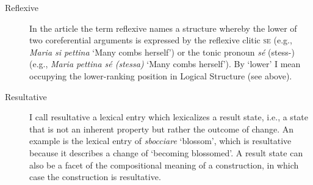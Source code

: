 \documentclass[output=paper,colorlinks,citecolor=brown
]{langscibook}
\begin{document}
\begin{description}
\item[Reflexive] In the article the term reflexive   names a structure whereby the lower of two coreferential arguments is   expressed by the reflexive clitic \textsc{se} (e.g.,   \textit{Maria si pettina} ‘Many combs herself’) or the tonic pronoun \textit{sé}   (stess-) (e.g., \textit{Maria pettina sé (stessa)} ‘Many combs herself’).   By ‘lower’ I mean occupying the lower-ranking position in Logical Structure   (see above).
\item[Resultative] I call resultative a   lexical entry which lexicalizes a result state, i.e., a state that is not an   inherent property but rather the outcome of change. An example is the lexical   entry of \textit{sbocciare} ‘blossom’, which is resultative because it   describes a change of ‘becoming blossomed’. A result state can also be a facet   of the compositional meaning of a construction, in which case the   construction is resultative.
\end{description}



\label{bentley:appendix:B}
\end{document}
